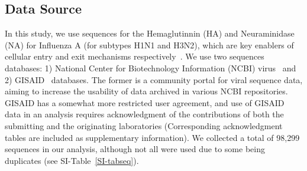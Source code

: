 \documentclass[onecolumn, compsoc,10pt]{IEEEtran}
\begin{document}
\subsection*{Data Source}
  
In this study, we use sequences for the Hemaglutinnin (HA)  and Neuraminidase (NA) for Influenza A (for subtypes H1N1 and H3N2), which are key enablers of cellular entry and exit mechanisms respectively~\cite{mcauley2019influenza}. We use two sequences databases: 1) National Center for Biotechnology Information (NCBI) virus~\cite{hatcher2017virus} and 2) GISAID~\cite{bogner2006global} databases. The former is a community portal for viral sequence data, aiming to increase the usability of data archived in various NCBI repositories. GISAID has a somewhat more restricted user agreement, and use of GISAID data in an analysis requires acknowledgment of the contributions of both the submitting and the originating laboratories (Corresponding acknowledgment tables are included as supplementary information). We collected a total of 98,299 sequences in our analysis, although not all were used due to some being duplicates (see SI-Table~\ref{SI-tabseq}).


  
  





%
% 



\clearpage
\end{document}
